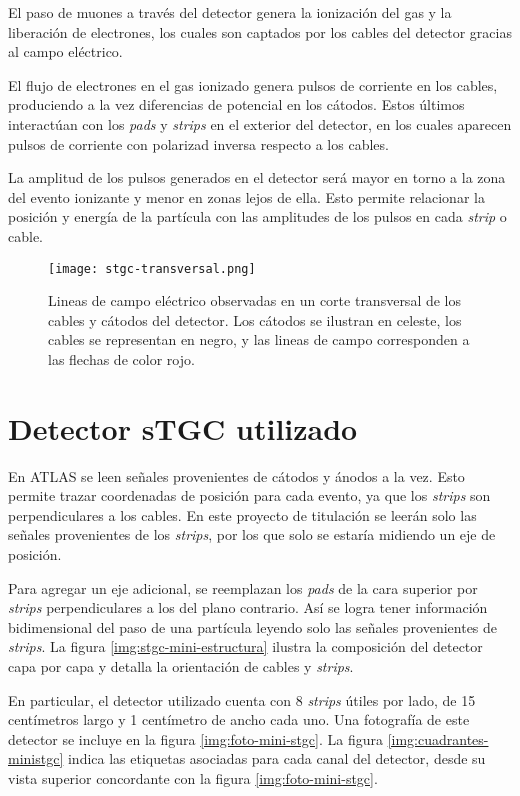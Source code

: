 	El paso de muones a través del detector genera la ionización del gas y la liberación de electrones, los cuales son captados por los cables del detector gracias al campo eléctrico.
	
	El flujo de electrones en el gas ionizado genera pulsos de corriente en los cables, produciendo a la vez diferencias de potencial en los cátodos. Estos últimos interactúan con los \textit{pads} y \textit{strips} en el exterior del detector, en los cuales aparecen pulsos de corriente con polarizad inversa respecto a los cables.
	
	La amplitud de los pulsos generados en el detector será mayor en torno a la zona del evento ionizante y menor en zonas lejos de ella. Esto permite relacionar la posición y energía de la partícula con las amplitudes de los pulsos en cada \textit{strip} o cable.
	
	\begin{figure}[h]
		\centering
		\texttt{[image: stgc-transversal.png]}
		\caption{Lineas de campo eléctrico observadas en un corte transversal de los cables y cátodos del detector. Los cátodos se ilustran en celeste, los cables se representan en negro, y las lineas de campo corresponden a las flechas de color rojo\cite{GEMTracker}.}
		\label{img:stgc-field}
	\end{figure}

\newpage
\section{Detector sTGC utilizado}
	En ATLAS se leen señales provenientes de cátodos y ánodos a la vez. Esto permite trazar coordenadas de posición para cada evento, ya que los \textit{strips} son perpendiculares a los cables. En este proyecto de titulación se leerán solo las señales provenientes de los \textit{strips}, por los que solo se estaría midiendo un eje de posición. 
	
	Para agregar un eje adicional, se reemplazan los \textit{pads} de la cara superior por \textit{strips} perpendiculares a los del plano contrario. Así se logra tener información bidimensional del paso de una partícula leyendo solo las señales provenientes de \textit{strips}. La figura \ref{img:stgc-mini-estructura} ilustra la composición del detector capa por capa y detalla la orientación de cables y \textit{strips}.
	
	En particular, el detector utilizado cuenta con 8 \textit{strips} útiles por lado, de 15 centímetros largo y 1 centímetro de ancho cada uno. Una fotografía de este detector se incluye en la figura \ref{img:foto-mini-stgc}. La figura \ref{img:cuadrantes-ministgc} indica las etiquetas asociadas para cada canal del detector, desde su vista superior concordante con la figura \ref{img:foto-mini-stgc}.
	
